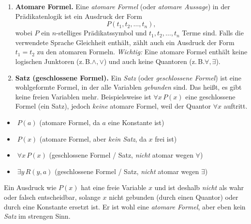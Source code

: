 \documentclass[main.tex]{subfiles}
\begin{document}
\begin{definition}
\label{def:atomare_formel}
\mbox{}
\begin{enumerate}
    \item \textbf{Atomare Formel.}  
    Eine \emph{atomare Formel} (oder \emph{atomare Aussage}) in der Prädikatenlogik ist ein Ausdruck der Form
    \[
        P(t_1, t_2, \ldots, t_n),
    \]
    wobei \(P\) ein \(n\)-stelliges Prädikatssymbol und \(t_1, t_2, \ldots, t_n\) Terme sind.  
    Falls die verwendete Sprache Gleichheit enthält, zählt auch ein Ausdruck der Form \(t_1 = t_2\) zu den atomaren Formeln.  
    \emph{Wichtig:} Eine atomare Formel enthält keine logischen Junktoren (z.\,B.\(\wedge, \lor\)) und auch keine Quantoren (z.\,B.\(\forall, \exists\)).

    \item \textbf{Satz (geschlossene Formel).}  
    Ein \emph{Satz} (oder \emph{geschlossene Formel}) ist eine wohlgeformte Formel, in der alle Variablen \emph{gebunden} sind. Das heißt, es gibt keine freien Variablen mehr. Beispielsweise ist \(\forall x\, P(x)\) eine geschlossene Formel (ein Satz), jedoch \emph{keine} atomare Formel, weil der Quantor \(\forall x\) auftritt.
\end{enumerate}

\begin{example}
\leavevmode
\begin{itemize}
    \item \(\;P(a)\) \quad (atomare Formel, da \(a\) eine Konstante ist)
    \item \(\;P(x)\) \quad (atomare Formel, aber \emph{kein Satz}, da \(x\) frei ist)
    \item \(\;\forall x\,P(x)\) \quad (geschlossene Formel / Satz, \emph{nicht} atomar wegen \(\forall\))
    \item \(\;\exists y\,R(y,a)\) \quad (geschlossene Formel / Satz, \emph{nicht} atomar wegen \(\exists\))
\end{itemize}
\end{example}

\begin{hint}
Ein Ausdruck wie \(P(x)\) hat eine freie Variable \(x\) und ist deshalb \emph{nicht} als wahr oder falsch entscheidbar, solange \(x\) nicht gebunden (durch einen Quantor) oder durch eine Konstante ersetzt ist. Er ist wohl eine \emph{atomare Formel}, aber eben kein \emph{Satz} im strengen Sinn.
\end{hint}
\end{definition}
\end{document}
